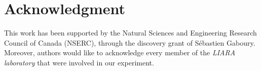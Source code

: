 \documentclass[10pt,conference]{IEEEtran}
\begin{document}



\section*{Acknowledgment}
This work has been supported by the Natural Sciences and Engineering Research Council of Canada (NSERC), through the discovery grant of S\'ebastien Gaboury. Moreover, authors would like to acknowledge every member of the \textit{LIARA laboratory} that were involved in our experiment. 



\end{document}
